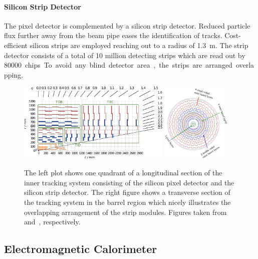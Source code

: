 \paragraph{Silicon Strip Detector} The pixel detector is complemented by a silicon
strip detector. Reduced particle flux further away from the beam pipe eases the identification
of tracks. Cost-efficient silicon strips are employed reaching out to
a radius of \SI{1.3}{\meter}. The strip detector consists of a total of 10 million
detecting strips which are read out by \SI{80000} chips. To avoid any blind
detector area, the strips are arranged overlapping.

\begin{figure}[htp]
    \centering
    \includegraphics[width=0.65\textwidth]{figures/experimental_setup/tracker.pdf}\hfill
    \includegraphics[width=0.3\textwidth]{figures/experimental_setup/tracking_sytem_barrel_slice.png}
    \caption[Inner tracking system]{The left plot shows one quadrant of a
        longitudinal section of the inner tracking system consisting of the
        silicon pixel detector and the silicon strip detector. The right figure shows a
        transverse section of the tracking system in the barrel region which
        nicely illustrates the overlapping arrangement of the strip modules. Figures taken
        from~\cite{Berger:2014aca} and~\cite{cmsweb:innertracker}, respectively.}
    \label{fig:cms:inner_tracking}
\end{figure}

\subsection{Electromagnetic Calorimeter}


